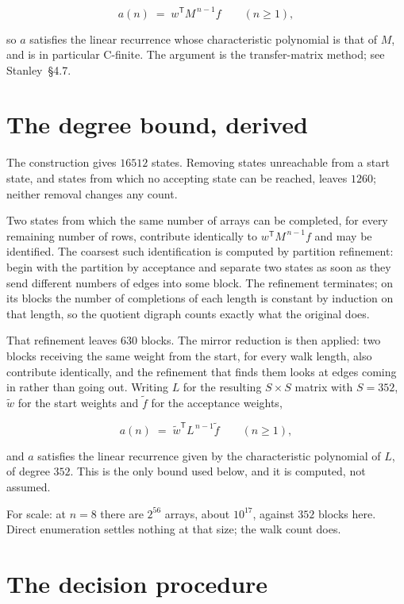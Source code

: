 \documentclass[11pt]{article}
\theoremstyle{definition}
\begin{document}
\[a(n) \;=\; w^{\mathsf T} M^{\,n-1} f \qquad (n \ge 1),\]

so $a$ satisfies the linear recurrence whose characteristic polynomial is that of $M$, and is in particular C-finite. The argument is the transfer-matrix method; see Stanley~\S4.7.

\section{The degree bound, derived}

The construction gives $16512$ states. Removing states unreachable from a start state, and states from which no accepting state can be reached, leaves $1260$; neither removal changes any count.

Two states from which the same number of arrays can be completed, for every remaining number of rows, contribute identically to $w^{\mathsf T}M^{\,n-1}f$ and may be identified. The coarsest such identification is computed by partition refinement: begin with the partition by acceptance and separate two states as soon as they send different numbers of edges into some block. The refinement terminates; on its blocks the number of completions of each length is constant by induction on that length, so the quotient digraph counts exactly what the original does.

That refinement leaves $630$ blocks. The mirror reduction is then applied: two blocks receiving the same weight from the start, for every walk length, also contribute identically, and the refinement that finds them looks at edges coming in rather than going out. Writing $L$ for the resulting $S \times S$ matrix with $S = 352$, $\tilde w$ for the start weights and $\tilde f$ for the acceptance weights,

\[a(n) \;=\; \tilde w^{\mathsf T} L^{\,n-1} \tilde f \qquad (n \ge 1),\]

and $a$ satisfies the linear recurrence given by the characteristic polynomial of $L$, of degree $352$. This is the only bound used below, and it is computed, not assumed.

For scale: at $n = 8$ there are $2^{56}$ arrays, about $10^{17}$, against $352$ blocks here. Direct enumeration settles nothing at that size; the walk count does.

\section{The decision procedure}
\end{document}
